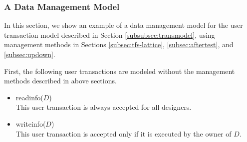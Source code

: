 \subsubsection{A Data Management Model}
 \label{subsubsec:construct}
In this section, we show an example of a data management model for the
user transaction model described in Section \ref{subsubsec:transmodel},
using management methods in Sections \ref{subsec:tfs-lattice},
\ref{subsec:aftertest}, and \ref{subsec:updown}.

First, the following user transactions are modeled without the
management methods described in above sections.
\begin{itemize}
\item readinfo($D$)\\
This user transaction is always accepted for all designers.
\item writeinfo($D$)\\
This user transaction is accepted only if it is executed by the owner of
$D$.
\end{itemize}

